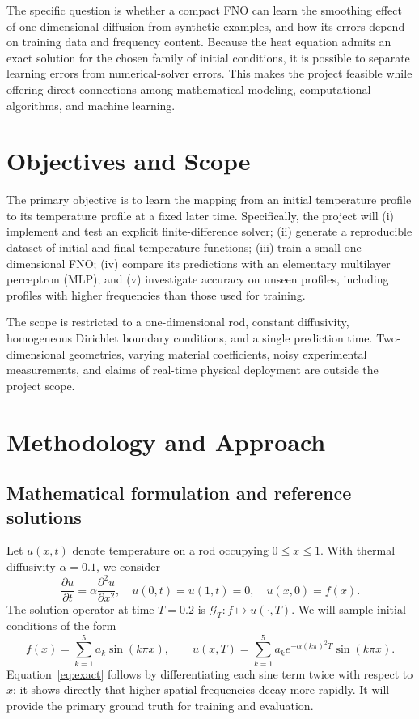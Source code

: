 \documentclass{article}
\begin{document}
The specific question is whether a compact FNO can learn the smoothing effect of one-dimensional diffusion from synthetic examples, and how its errors depend on training data and frequency content. Because the heat equation admits an exact solution for the chosen family of initial conditions, it is possible to separate learning errors from numerical-solver errors. This makes the project feasible while offering direct connections among mathematical modeling, computational algorithms, and machine learning.

\section{Objectives and Scope}
The primary objective is to learn the mapping from an initial temperature profile to its temperature profile at a fixed later time. Specifically, the project will (i) implement and test an explicit finite-difference solver; (ii) generate a reproducible dataset of initial and final temperature functions; (iii) train a small one-dimensional FNO; (iv) compare its predictions with an elementary multilayer perceptron (MLP); and (v) investigate accuracy on unseen profiles, including profiles with higher frequencies than those used for training.

The scope is restricted to a one-dimensional rod, constant diffusivity, homogeneous Dirichlet boundary conditions, and a single prediction time. Two-dimensional geometries, varying material coefficients, noisy experimental measurements, and claims of real-time physical deployment are outside the project scope.

\section{Methodology and Approach}
\subsection{Mathematical formulation and reference solutions}
Let $u(x,t)$ denote temperature on a rod occupying $0\leq x\leq 1$. With thermal diffusivity $\alpha=0.1$, we consider
\begin{equation}
\frac{\partial u}{\partial t}=\alpha\frac{\partial^2u}{\partial x^2},\quad
u(0,t)=u(1,t)=0,\quad u(x,0)=f(x).
\label{eq:heat}
\end{equation}
The solution operator at time $T=0.2$ is $\mathcal G_T:f\mapsto u(\cdot,T)$. We will sample initial conditions of the form
\begin{equation}
f(x)=\sum_{k=1}^{5}a_k\sin(k\pi x),\qquad
u(x,T)=\sum_{k=1}^{5}a_k e^{-\alpha(k\pi)^2T}\sin(k\pi x).
\label{eq:exact}
\end{equation}
Equation~\eqref{eq:exact} follows by differentiating each sine term twice with respect to $x$; it shows directly that higher spatial frequencies decay more rapidly. It will provide the primary ground truth for training and evaluation.
\end{document}
